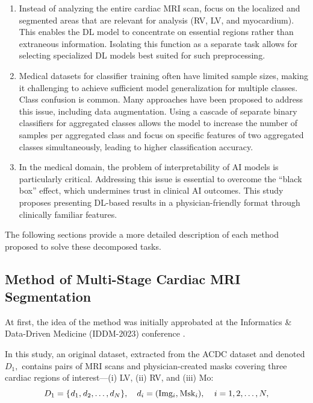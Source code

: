 \documentclass[fleqn,10pt]{wlscirep}
\begin{document}
\begin{enumerate}
    \item Instead of analyzing the entire cardiac MRI scan, focus on the localized and segmented areas that are relevant for analysis (RV, LV, and myocardium). This enables the DL model to concentrate on essential regions rather than extraneous information. Isolating this function as a separate task allows for selecting specialized DL models best suited for such preprocessing.
    \item Medical datasets for classifier training often have limited sample sizes, making it challenging to achieve sufficient model generalization for multiple classes. Class confusion is common. Many approaches have been proposed to address this issue, including data augmentation. Using a cascade of separate binary classifiers for aggregated classes allows the model to increase the number of samples per aggregated class and focus on specific features of two aggregated classes simultaneously, leading to higher classification accuracy.
    \item In the medical domain, the problem of interpretability of AI models is particularly critical. Addressing this issue is essential to overcome the “black box” effect, which undermines trust in clinical AI outcomes. This study proposes presenting DL-based results in a physician-friendly format through clinically familiar features.
\end{enumerate}

The following sections provide a more detailed description of each method proposed to solve these decomposed tasks.

\subsection*{Method of Multi-Stage Cardiac MRI Segmentation}

At first, the idea of the method was initially approbated at the Informatics \& Data-Driven Medicine (IDDM-2023) conference \cite{Slobodzian:2024}.

In this study, an original dataset, extracted from the ACDC dataset and denoted \({D_1},\) contains pairs of MRI scans and physician-created masks covering three cardiac regions of interest—(i) LV, (ii) RV, and (iii) Mo:
\begin{equation}
    {D_1} = \{ {\mkern 1mu} {d_1},{\mkern 1mu} {d_2}, \ldots ,{d_N}\} ,\quad {d_i} = ({\rm{Im}}{{\rm{g}}_i},{\mkern 1mu} {\rm{Ms}}{{\rm{k}}_i}),\quad {\kern 1pt} i = 1,2, \ldots ,N,
\end{equation}
\end{document}
